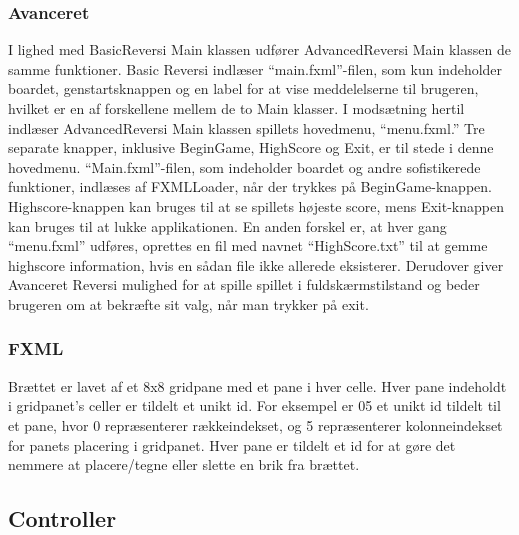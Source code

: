 \subsubsection{Avanceret} \label{am}
I lighed med BasicReversi Main klassen udfører AdvancedReversi Main klassen de samme funktioner. Basic Reversi indlæser ``main.fxml''-filen, som kun indeholder boardet, genstartsknappen og en label for at vise meddelelserne til brugeren, hvilket er en af forskellene mellem de to Main klasser. I modsætning hertil indlæser AdvancedReversi Main klassen spillets hovedmenu, ``menu.fxml.'' Tre separate knapper, inklusive BeginGame, HighScore og Exit, er til stede i denne hovedmenu. ``Main.fxml''-filen, som indeholder boardet og andre sofistikerede funktioner, indlæses af FXMLLoader, når der trykkes på BeginGame-knappen. Highscore-knappen kan bruges til at se spillets højeste score, mens Exit-knappen kan bruges til at lukke applikationen. En anden forskel er, at hver gang ``menu.fxml'' udføres, oprettes en fil med navnet ``HighScore.txt'' til at gemme highscore information, hvis en sådan file ikke allerede eksisterer. Derudover giver Avanceret Reversi mulighed for at spille spillet i fuldskærmstilstand og beder brugeren om at bekræfte sit valg, når man trykker på exit.
\subsubsection{FXML}\label{BD}
Brættet er lavet af et 8x8 gridpane med et pane i hver celle. Hver pane indeholdt i gridpanet's celler er tildelt et unikt id. For eksempel er 05 et unikt id tildelt til et pane, hvor 0 repræsenterer rækkeindekset, og 5 repræsenterer kolonneindekset for panets placering i gridpanet. Hver pane er tildelt et id for at gøre det nemmere at placere/tegne eller slette en brik fra brættet.
\subsection{Controller}
